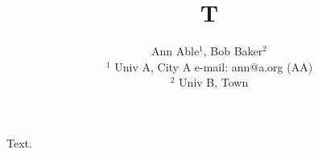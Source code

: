 \documentclass{article}
\begin{document}
\title{T}
\author{Ann Able$^1$, Bob Baker$^2$ \\
$^1$ Univ A, City A e-mail: ann@a.org (AA) \\
$^2$ Univ B, Town}
\maketitle
Text.
\end{document}
